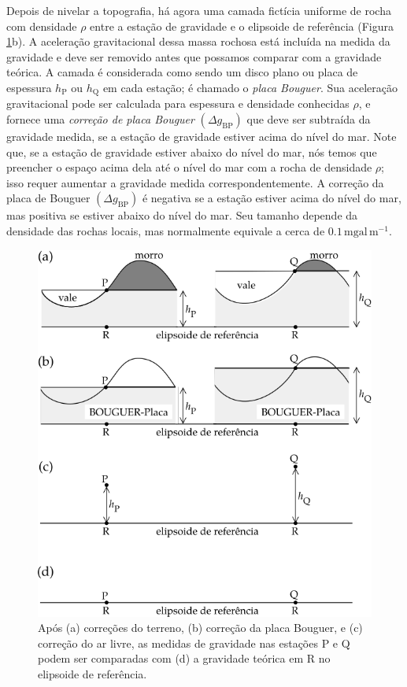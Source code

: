 \documentclass[]{book}
\theoremstyle{definition}
\theoremstyle{definition}
\theoremstyle{definition}
\theoremstyle{remark}
\begin{document}
Depois de nivelar a topografia, há agora uma camada fictícia uniforme de rocha com densidade \(\rho\) entre a estação de gravidade e o elipsoide de referência (Figura \ref{fig:correcao}b). A aceleração gravitacional dessa massa rochosa está incluída na medida da gravidade e deve ser removido antes que possamos comparar com a gravidade teórica. A camada é considerada como sendo um disco plano ou placa de espessura \(h_{\mathrm{P}}\) ou \(h_{\mathrm{Q}}\) em cada estação; é chamado o \emph{placa Bouguer}. Sua aceleração gravitacional pode ser calculada para espessura e densidade conhecidas \(\rho\), e fornece uma \emph{correção de placa Bouguer} \(\left(\Delta g_{\mathrm{BP}}\right)\) que deve ser subtraída da gravidade medida, se a estação de gravidade estiver acima do nível do mar. Note que, se a estação de gravidade estiver abaixo do nível do mar, nós temos que preencher o espaço acima dela até o nível do mar com a rocha de densidade \(\rho\); isso requer aumentar a gravidade medida correspondentemente. A correção da placa de Bouguer \(\left(\Delta g_{\mathrm{BP}}\right)\) é negativa se a estação estiver acima do nível do mar, mas positiva se estiver abaixo do nível do mar. Seu tamanho depende da densidade das rochas locais, mas normalmente equivale a cerca de \(0.1\,\mathrm{mgal}\, \mathrm{m}^{-1}\).

\begin{figure}

{\centering \includegraphics[width=0.6\linewidth]{fig/Fig_02.29} 

}

\caption{Após (a) correções do terreno, (b) correção da placa Bouguer, e (c) correção do ar livre, as medidas de gravidade nas estações P e Q podem ser comparadas com (d) a gravidade teórica em R no elipsoide de referência.}\label{fig:correcao}
\end{figure}
\end{document}
